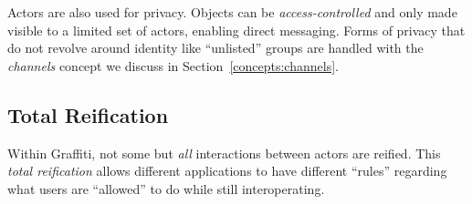 Actors are also used for privacy.
Objects can be \emph{access-controlled} and only
made visible to a limited set of actors, enabling
direct messaging.
Forms of privacy that do not revolve around identity
like ``unlisted'' groups are handled
with the \emph{channels} concept we discuss in
Section~\ref{concepts:channels}.



\subsection{Total Reification}
\label{concepts:total-reification}

Within Graffiti, not some but \emph{all} interactions between actors
are reified.
This \emph{total reification} allows different applications to have
different ``rules'' regarding what users are ``allowed'' to do while
still interoperating.




